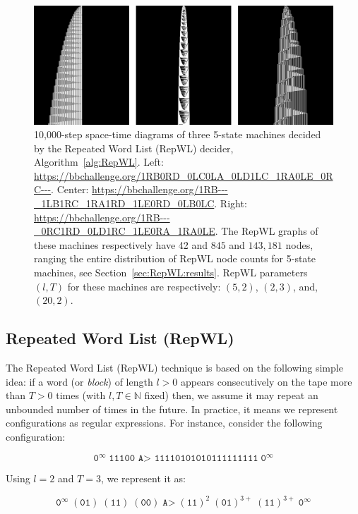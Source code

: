 \begin{figure}[h!]
    \centering
    \includegraphics[scale=0.48]{figures/RepWL/RepWL_three_machines.pdf}
    \caption{10,000-step space-time diagrams of three 5-state machines decided by the Repeated Word List (RepWL) decider, Algorithm~\ref{alg:RepWL}. Left: {\small \url{https://bbchallenge.org/1RB0RD_0LC0LA_0LD1LC_1RA0LE_0RC---}}. Center: {\small \url{https://bbchallenge.org/1RB---_1LB1RC_1RA1RD_1LE0RD_0LB0LC}}. Right: {\small \url{https://bbchallenge.org/1RB---_0RC1RD_0LD1RC_1LE0RA_1RA0LE}}. The RepWL graphs of these machines respectively have 42 and $845$ and $143{,}181$ nodes, ranging the entire distribution of RepWL node counts for 5-state machines, see Section~\ref{sec:RepWL:results}. RepWL parameters $(l,T)$ for these machines are respectively: $(5,2)$, $(2,3)$, and, $(20,2)$.
    }\label{fig:repWLThree}
\end{figure}

\subsection{Repeated Word List (RepWL)}\label{sec:RepWL}

The Repeated Word List (RepWL) technique is based on the following simple idea: if a word (or \textit{block}) of length $l > 0$ appears consecutively on the tape more than $T > 0$ times (with $l, T \in \mathbb{N}$ fixed) then, we assume it may repeat an unbounded number of times in the future. In practice, it means we represent configurations as regular expressions. For instance, consider the following configuration:

$$ \texttt{0}^\infty \; \texttt{11100 A> 11110101010111111111} \; \texttt{0}^\infty$$

Using $l=2$ and $T = 3$, we represent it as:

$$ \texttt{0}^\infty \; (\texttt{01}) \; (\texttt{11}) \; (\texttt{00}) \; \texttt{A>} \; (\texttt{11})^2 \; (\texttt{01})^{3+} \; (\texttt{11})^{3+} \; \texttt{0}^\infty $$

